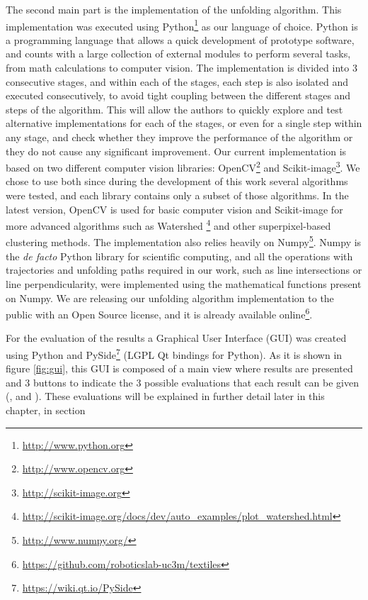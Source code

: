 The second main part is the implementation of the unfolding algorithm. This implementation was executed using Python\footnote{\url{http://www.python.org}} as our language of choice. Python is a programming language that allows a quick development of prototype software, and counts with a large collection of external modules to perform several tasks, from math calculations to computer vision. The implementation is divided into 3 consecutive stages, and within each of the stages, each step is also isolated and executed consecutively, to avoid tight coupling between the different stages and steps of the algorithm. This will allow the authors to quickly explore and test alternative implementations for each of the stages, or even for a single step within any stage, and check whether they improve the performance of the algorithm or they do not cause any significant improvement. Our current implementation is based on two different computer vision libraries: OpenCV\footnote{\url{http://www.opencv.org}} and Scikit-image\footnote{\url{http://scikit-image.org}}. We chose to use both since during the development of this work several algorithms were tested, and each library contains only a subset of those algorithms. In the latest version, OpenCV is used for basic computer vision and Scikit-image for more advanced algorithms such as Watershed \footnote{\url{http://scikit-image.org/docs/dev/auto_examples/plot_watershed.html}} and other superpixel-based clustering methods. The implementation also relies heavily on Numpy\footnote{\url{http://www.numpy.org/}}. Numpy is the \textit{de facto} Python library for scientific computing, and all the operations with trajectories and unfolding paths required in our work, such as line intersections or line perpendicularity, were implemented using the mathematical functions present on Numpy. We are releasing our unfolding algorithm implementation to the public with an Open Source license, and it is already available online\footnote{\url{https://github.com/roboticslab-uc3m/textiles}}.


For the evaluation of the results a Graphical User Interface (GUI) was created using Python and PySide\footnote{\url{https://wiki.qt.io/PySide}} (LGPL Qt bindings for Python). As it is shown in figure \ref{fig:gui}, this GUI is composed of a main view where results are presented and 3 buttons to indicate the 3 possible evaluations that each result can be given (\fail{}, \good{} and \great{}). These evaluations will be explained in further detail later in this chapter, in section  

